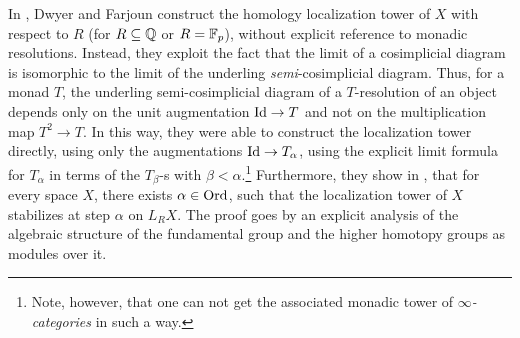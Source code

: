 \documentclass[12pt]{article}
\begin{document}
In \cite{dror1977long}, Dwyer and Farjoun construct the homology localization tower of $X$ with respect to $R$ (for $R\subseteq \mathbb{Q}$ or $R=\mathbb{F}_p$), without explicit reference to monadic resolutions. Instead, they exploit the fact that the limit of a cosimplicial diagram is isomorphic to the limit of the underling \textit{semi}-cosimplicial diagram. Thus, for a monad $T$, the underling semi-cosimplicial diagram of a $T$-resolution of an object depends only on the unit augmentation $\mathrm{Id} \to T$ and not on the multiplication map $T^2\to T$. In this way, they were able to construct the localization tower directly, using only the augmentations $\mathrm{Id} \to T_\alpha$, using the explicit limit formula for $T_\alpha$ in terms of the $T_\beta$-s with $\beta<\alpha$.\footnote{Note, however, that one can not get the associated monadic tower of \textit{$\infty$-categories} in such a way.} Furthermore, they show in \cite[Proposition 1.2]{dror1977long}, that for every space $X$, there exists $\alpha \in \mathrm{Ord}$, such that the localization tower of $X$ stabilizes at step $\alpha$ on $L_R X$. The proof goes by an explicit analysis of the algebraic structure of the fundamental group and the higher homotopy groups as modules over it.



\end{document}
